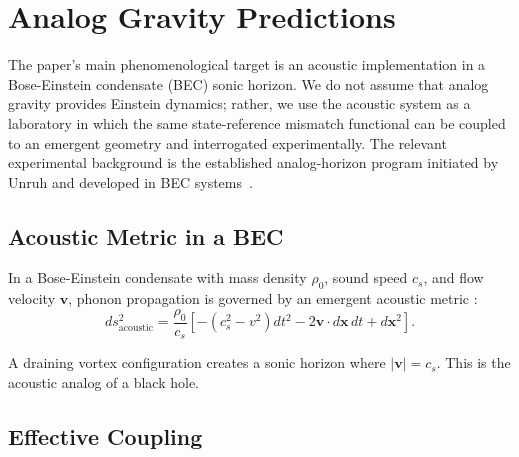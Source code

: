 \documentclass[aps,prd,twocolumn,superscriptaddress,nofootinbib,floatfix]{revtex4-2}
\begin{document}
\section{Analog Gravity Predictions}
\label{appendix:analog}

The paper's main phenomenological target is an acoustic implementation in a Bose-Einstein condensate (BEC) sonic horizon. We do not assume that analog gravity provides Einstein dynamics; rather, we use the acoustic system as a laboratory in which the same state-reference mismatch functional can be coupled to an emergent geometry and interrogated experimentally. The relevant experimental background is the established analog-horizon program initiated by Unruh and developed in BEC systems~\cite{Unruh1981,Barcelo2005,Steinhauer2016}.

\subsection{Acoustic Metric in a BEC}

In a Bose-Einstein condensate with mass density $\rho_0$, sound speed $c_s$, and flow velocity $\mathbf{v}$, phonon propagation is governed by an emergent acoustic metric \cite{Unruh1981,Barcelo2005}:
\begin{equation}
    ds^2_{\mathrm{acoustic}} = \frac{\rho_0}{c_s} \left[ -(c_s^2 - v^2) dt^2 - 2 \mathbf{v} \cdot d\mathbf{x}\, dt + d\mathbf{x}^2 \right].
    \label{eq:acoustic-metric}
\end{equation}

A draining vortex configuration creates a sonic horizon where $|\mathbf{v}| = c_s$. This is the acoustic analog of a black hole.

\subsection{Effective Coupling}
\end{document}
